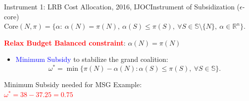 \documentclass[14pt]{beamer}
\newcommand{\R}{\mathbb{R}}
\begin{document}
\begin{frame}{Instrument 1: LRB Cost Allocation, {\footnotesize 2016, IJOC}}{Instrument of Subsidization ($\epsilon$-core)}
\vspace{3mm}
{\footnotesize $\mathrm{Core}(N,\pi) = \bigg\{ \alpha:~ \alpha(N)=\pi(N), ~\alpha(S) \leq \pi(S), ~\forall S \in \mathbb{S} \setminus \{N\},~\alpha \in \R^n   \bigg\}$.}

\begin{shaded}
\centering \textcolor{red}{\bf Relax Budget Balanced constraint}: $\alpha(N) = \pi(N)$
\end{shaded}
\begin{itemize}
\item \textcolor{blue}{Minimum Subsidy} to stabilize the grand coalition:
\begin{equation*}
\omega^* = \min \big\{ \pi(N) - \alpha(N): \alpha(S) \leq \pi(S), ~\forall S \in \mathbb{S} \big\}.
\end{equation*}
\end{itemize}
\pause
\vspace{-7mm}
\begin{shaded}
\centering
\small
Minimum Subsidy needed for MSG Example:\\
\vspace{2mm}
\textcolor{red}{$\omega^*=38-37.25 = 0.75$}
\end{shaded}
\end{frame}
\end{document}
